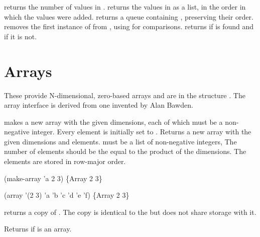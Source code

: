 \begin{protos}
\end{protos}
\noindent
{} returns the number of values in .
 returns the values in  as a list, in the
 order in which the values were added.
 returns a queue containing , preserving
 their order.
 removes the first instance of  from
 , using  for comparisons.
 returns  if  is found and
  if it is not.

\section{Arrays}

These provide N-dimensional, zero-based arrays and
 are in the structure .
The array interface is derived from one invented by Alan Bawden.

\begin{protos}
\end{protos}
\noindent
{} makes a new array with the given dimensions, each of which
 must be a non-negative integer.
Every element is initially set to .
 Returns a new array with the given dimensions and elements.
 must be a list of non-negative integers, 
The number of elements should be the equal to the product of the
 dimensions.
The elements are stored in row-major order.
\begin{example}
(make-array 'a 2 3) \evalsto \{Array 2 3\}

(array '(2 3) 'a 'b 'c 'd 'e 'f)
    \evalsto \{Array 2 3\}
\end{example}

 returns a copy of .
The copy is identical to the  but does not share storage with it.

\begin{protos}
\end{protos}
\noindent
Returns  if  is an array.

